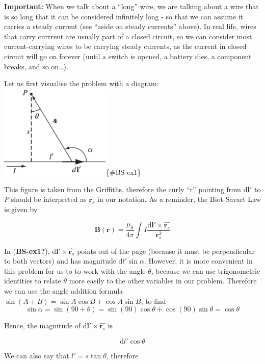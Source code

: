 \documentclass[
  letterpaper,
  DIV=11,
  numbers=noendperiod]{scrreprt}
\begin{document}
\textbf{Important:} When we talk about a ``long'' wire, we are talking
about a wire that is so long that it can be considered infinitely long -
so that we can assume it carries a steady current (see ``aside on steady
currents'' above). In real life, wires that carry currrent are usually
part of a closed circuit, so we can consider most current-carrying wires
to be carrying steady currents, as the current in closed circuit will go
on forever (until a switch is opened, a battery dies, a component
breaks, and so on\ldots).

Let us first visualise the problem with a diagram:
\includegraphics[width=2.08333in,height=\textheight]{Figures/BS-example-1.png}\{\#BS-ex1\}

This figure is taken from the Griffiths, therefore the curly ``r''
pointing from \(\mathrm{d} \mathrm{\mathbf{l}}'\) to \(P\) should be
interpreted as \(\mathrm{\mathbf{r}}_s\) in our notation. As a reminder,
the Biot-Savart Law is given by

\[\mathrm{\mathbf{B}}(\mathrm{\mathbf{r}}) =  \frac{\mu_0}{4\pi} \int I \frac{\mathrm{d} \mathrm{\mathbf{l}}' \times \hat{\mathrm{\mathbf{r}}_s} }{\mathrm{\mathbf{r}}_s^2} \]

In (\textbf{BS-ex1?}),
\(\mathrm{d} \mathrm{\mathbf{l}}' \times \hat{\mathrm{\mathbf{r}}_s}\)
points out of the page (because it must be perpendicular to both
vectors) and has magnitude \(\mathrm{d} l' \sin\alpha\). However, it is
more convenient in this problem for us to to work with the angle
\(\theta\), because we can use trigonometric identities to relate
\(\theta\) more easily to the other variables in our problem. Therefore
we can use the angle addition formula
\(\sin(A + B) = \sin A \cos B + \cos A \sin B\), to find
\[ \sin\alpha = \sin(90 + \theta) = \sin(90)\cos\theta + \cos(90)\sin\theta = \cos\theta \]

Hence, the magnitude of
\(\mathrm{d} \mathrm{\mathbf{l}}' \times \hat{\mathrm{\mathbf{r}}_s}\)
is

\[ \mathrm{d} l' \cos\theta \]

We can also say that \(l' = s \tan\theta\), therefore
\end{document}
